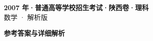 \documentclass[zihao=-4, a4paper]{ctexart}
\begin{document}
\begin{center}
  {\Large\bfseries 2007 年·普通高等学校招生考试·陕西卷·理科}\\[4pt]
  {\large 数学 · 解析版}
\end{center}
\medskip
{}

\clearpage
{}
\begin{center}{\Large\bfseries 参考答案与详细解析}\end{center}
\medskip

\end{document}
